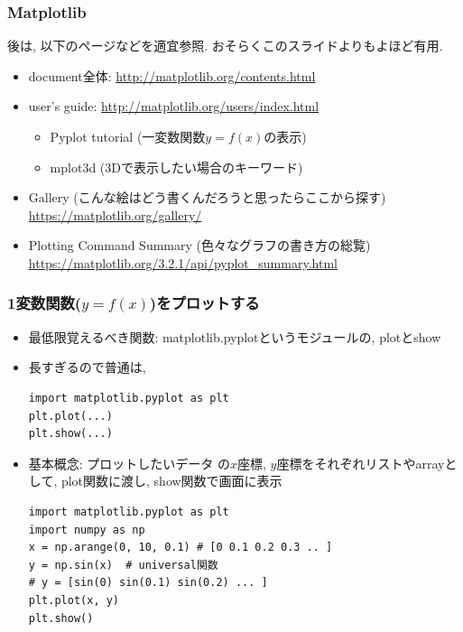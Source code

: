 \documentclass[10pt,dvipdfmx]{beamer}
\newcommand{\ao}[1]{{\color{blue}#1}}
\begin{document}
\begin{frame}
\frametitle{Matplotlib}
後は, 以下のページなどを適宜参照. おそらくこのスライドよりもよほど有用.
\begin{itemize}
\item document全体: \url{http://matplotlib.org/contents.html}
\item user's guide: \url{http://matplotlib.org/users/index.html}
  \begin{itemize}
  \item Pyplot tutorial (一変数関数$y=f(x)$の表示)
  \item mplot3d (3Dで表示したい場合のキーワード)
  \end{itemize}

\item Gallery (こんな絵はどう書くんだろうと思ったらここから探す)
\url{https://matplotlib.org/gallery/}

\item Plotting Command Summary (色々なグラフの書き方の総覧)
\url{https://matplotlib.org/3.2.1/api/pyplot_summary.html}

\end{itemize}

\end{frame}

\begin{frame}[fragile]
\frametitle{1変数関数($y = f(x)$)をプロットする}

\begin{itemize}
\item 最低限覚えるべき関数: \ao{matplotlib.pyplot}というモジュールの,
\ao{plot}と\ao{show}
\item 長すぎるので普通は,
\begin{lstlisting}
import matplotlib.pyplot as plt
plt.plot(...)
plt.show(...)
\end{lstlisting}

\item 基本概念: \ao{プロットしたいデータ
の$x$座標, $y$座標をそれぞれリストやarrayとして, 
plot関数に渡し, show関数で画面に表示}
\begin{lstlisting}
import matplotlib.pyplot as plt
import numpy as np
x = np.arange(0, 10, 0.1) # [0 0.1 0.2 0.3 .. ]
y = np.sin(x)  # universal関数
# y = [sin(0) sin(0.1) sin(0.2) ... ] 
plt.plot(x, y)
plt.show()
\end{lstlisting}
\end{itemize}
\end{frame}
\end{document}
